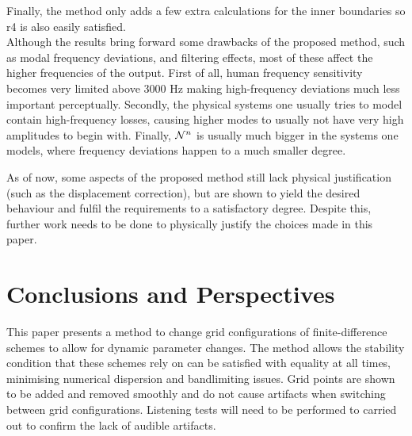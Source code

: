 Finally, the method only adds a few extra calculations for the inner boundaries so r4 is also easily satisfied. 
\\

Although the results bring forward some drawbacks of the proposed method, such as modal frequency deviations, and filtering effects, most of these affect the higher frequencies of the output. First of all, human frequency sensitivity becomes very limited above 3000 Hz \cite{Zwicker1990} making high-frequency deviations much less important perceptually. Secondly, the physical systems one usually tries to model contain high-frequency losses, causing higher modes to usually not have very high amplitudes to begin with. Finally, $\mathcal{N}^n$ is usually much bigger in the systems one models, where frequency deviations happen to a much smaller degree. 

As of now, some aspects of the proposed method still lack physical justification (such as the displacement correction), but are shown to yield the desired behaviour and fulfil the requirements to a satisfactory degree. Despite this, further work needs to be done to physically justify the choices made in this paper.


\section{Conclusions and Perspectives}\label{sec:conclusion}
This paper presents a method to change grid configurations of finite-difference schemes to allow for dynamic parameter changes. The method allows the stability condition that these schemes rely on can be satisfied with equality at all times, minimising numerical dispersion and bandlimiting issues. Grid points are shown to be added and removed smoothly and do not cause artifacts when switching between grid configurations. Listening tests will need to be performed to carried out to confirm the lack of audible artifacts.

